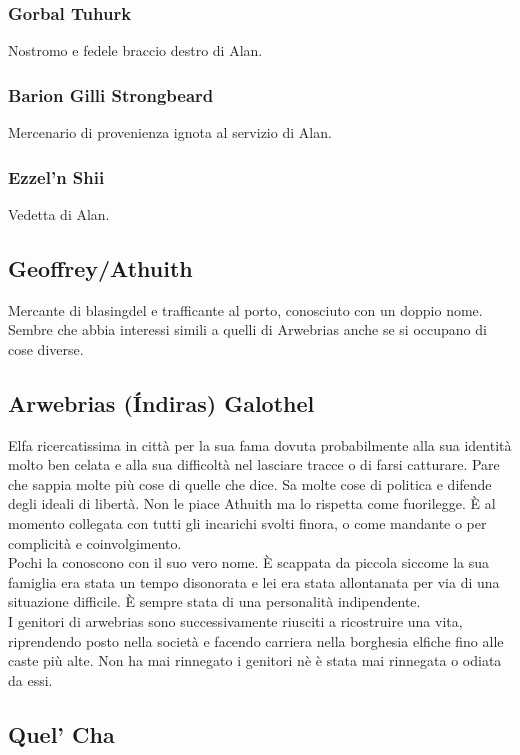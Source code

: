 \subsubsection{Gorbal Tuhurk}\label{char:gorbal}
Nostromo e fedele braccio destro di Alan.
\subsubsection{Barion Gilli Strongbeard}\label{char:barion}
Mercenario di provenienza ignota al servizio di Alan.
\subsubsection{Ezzel'n Shii}\label{char:ezzel}
Vedetta di Alan.
\subsection{Geoffrey/Athuith}\label{char:geoffrey}
Mercante di blasingdel e trafficante al porto, conosciuto con un doppio nome.
Sembre che abbia interessi simili a quelli di Arwebrias anche se si occupano di
cose diverse.
\subsection{Arwebrias (\'Indiras) Galothel}\label{char:arwebrias}
Elfa ricercatissima in citt\`a per la sua fama dovuta probabilmente alla sua identit\`a
molto ben celata e alla sua difficolt\`a nel lasciare tracce o di farsi catturare.
Pare che sappia molte pi\`u cose di quelle che dice. Sa molte cose di politica e difende
degli ideali di libert\`a. Non le piace Athuith ma lo rispetta come fuorilegge. \`E al
momento collegata con tutti gli incarichi svolti finora, o come mandante o per complicit\`a
e coinvolgimento.\\
Pochi la conoscono con il suo vero nome. \`E scappata da piccola siccome la sua famiglia era
stata un tempo disonorata e lei era stata allontanata per via di una situazione difficile.
\`E sempre stata di una personalit\`a indipendente. \\
I genitori di arwebrias sono successivamente riusciti a ricostruire una vita, riprendendo
posto nella societ\`a e facendo carriera nella borghesia elfiche fino alle caste pi\`u alte.
Non ha mai rinnegato i genitori n\`e \`e stata mai rinnegata o odiata da essi.
\subsection{Quel' Cha}
\label{char:quelcha}
